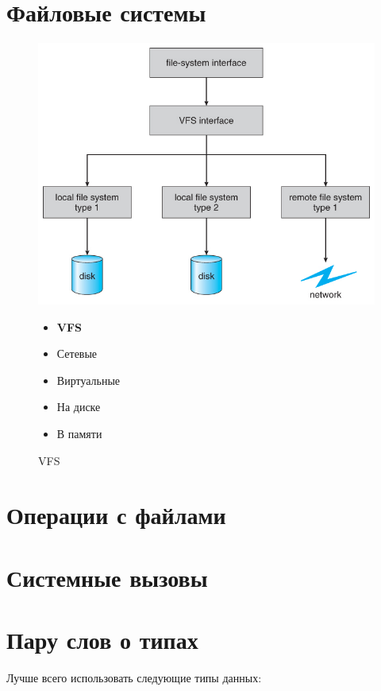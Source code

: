 \documentclass[../../lectures.tex]{subfiles}
\begin{document}
\section{Файловые системы}
\begin{figure}[H]
\begin{minipage}[c]{0.6\linewidth}
\centering
\includegraphics[width=\textwidth]{images/virtual-fs.jpg}
\caption{VFS}
\end{minipage}
\begin{minipage}[c]{0.4\linewidth}
\begin{itemize}
    \item \textbf{VFS}
    \item Сетевые
    \item Виртуальные
    \item На диске
    \item В памяти
\end{itemize}
\end{minipage}
\end{figure}

\section{Операции с файлами}

\section{Системные вызовы}
\todo{}

\section{Пару слов о типах}
Лучше всего использовать следующие типы данных:
\end{document}
